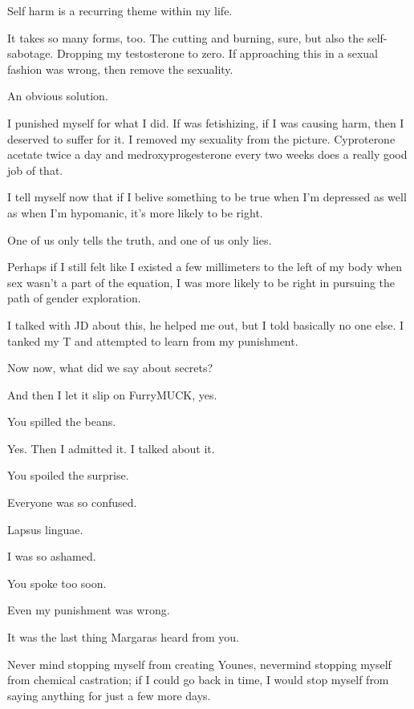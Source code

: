 \noindent Self harm is a recurring theme within my life.

It takes so many forms, too. The cutting and burning, sure, but also the self-sabotage. Dropping my testosterone to zero. If approaching this in a sexual fashion was wrong, then remove the sexuality.

\begin{ally}
An obvious solution.
\end{ally}
I punished myself for what I did. If was fetishizing, if I was causing harm, then I deserved to suffer for it. I removed my sexuality from the picture. Cyproterone acetate twice a day and medroxyprogesterone every two weeks does a really good job of that.

I tell myself now that if I belive something to be true when I'm depressed as well as when I'm hypomanic, it's more likely to be right.

\begin{ally}
One of us only tells the truth, and one of us only lies.
\end{ally}
Perhaps if I still felt like I existed a few millimeters to the left of my body when sex wasn't a part of the equation, I was more likely to be right in pursuing the path of gender exploration.

I talked with JD about this, he helped me out, but I told basically no one else. I tanked my T and attempted to learn from my punishment.

\begin{ally}
Now now, what did we say about secrets?
\end{ally}
And then I let it slip on FurryMUCK, yes.

\begin{ally}
You spilled the beans.
\end{ally}
Yes. Then I admitted it. I talked about it.

\begin{ally}
You spoiled the surprise.
\end{ally}
Everyone was so confused.

\begin{ally}
Lapsus linguae.
\end{ally}
I was so ashamed.

\begin{ally}
You spoke too soon.
\end{ally}
Even my punishment was wrong.

\begin{ally}
It was the last thing Margaras heard from you.
\end{ally}
Never mind stopping myself from creating Younes, nevermind stopping myself from chemical castration; if I could go back in time, I would stop myself from saying anything for just a few more days.

